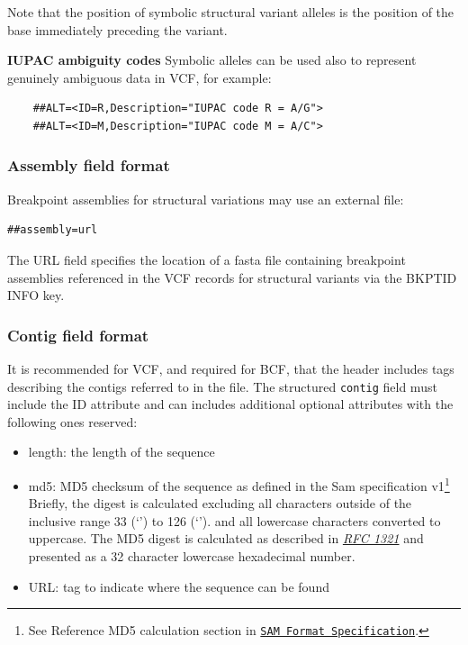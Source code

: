 \documentclass[8pt]{article}
\begin{document}
Note that the position of symbolic structural variant alleles is the position of the base immediately preceding the variant.

\bigskip

\noindent \textbf{IUPAC ambiguity codes} \newline
Symbolic alleles can be used also to represent genuinely ambiguous data in VCF, for example:
\begin{verbatim}
    ##ALT=<ID=R,Description="IUPAC code R = A/G">
    ##ALT=<ID=M,Description="IUPAC code M = A/C">
\end{verbatim}

\subsubsection{Assembly field format}
Breakpoint assemblies for structural variations may use an external file:
\begin{verbatim}
##assembly=url
\end{verbatim}

The URL field specifies the location of a fasta file containing breakpoint assemblies referenced in the VCF records for structural variants via the BKPTID INFO key.

\subsubsection{Contig field format}
\label{sec-contig-field}
It is recommended for VCF, and required for BCF, that the header includes tags describing the contigs referred to in the file.
The structured \texttt{contig} field must include the ID attribute and can includes additional optional attributes with
the following ones reserved:
\begin{itemize}
  \item length: the length of the sequence
  \item md5: MD5 checksum of the sequence as defined in the Sam specification v1\footnote{See Reference MD5 calculation
      section in \href{https://samtools.github.io/hts-specs/SAMv1.pdf}{\tt SAM Format Specification}.} Briefly, the digest
      is calculated excluding all characters outside of the inclusive range 33 (`') to 126 (`').
      and all lowercase characters converted to uppercase. The MD5 digest is calculated as described in
      \href{https://tools.ietf.org/html/rfc1321}{\sl RFC 1321} and presented as a 32 character lowercase hexadecimal number.
  \item URL: tag to indicate where the sequence can be found
\end{itemize}
\end{document}

